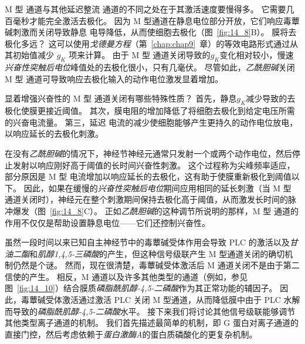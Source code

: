 M 型  通道与其他延迟整流  通道的不同之处在于其激活速度要慢得多。
它需要几百毫秒才能完全激活去极化。
因为 M 型通道在静息电位部分开放，它们响应毒蕈碱刺激而关闭导致静息  电导降低，从而使细胞去极化（图~\ref{fig:14_8}B）。
膜将去极化多远？
这可以使用\textit{戈德曼方程}（第~\ref{chap:chap9}~章）的等效电路形式通过从其初始值减少 $g_K$ 项来计算。
由于 M 型  通道关闭导致的$g_K$变化相对较小，慢速\textit{兴奋性突触后电位}峰值处的去极化很小，只有几毫伏。
尽管如此，\textit{乙酰胆碱}关闭 M 型  通道可导致响应去极化输入的动作电位激发显着增加。


显着增强兴奋性的 M 型  通道关闭有哪些特殊性质？
首先，静息$g_K$减少导致的去极化使膜更接近阈值。
其次，膜电阻的增加降低了将细胞去极化到给定电压所需的兴奋电流量。
第三，延迟  电流的减少使细胞能够产生更持久的动作电位放电，以响应延长的去极化刺激。


在没有\textit{乙酰胆碱}的情况下，神经节神经元通常只发射一个或两个动作电位，然后停止发射以响应刚好高于阈值的长时间兴奋性刺激。
这个过程称为尖峰频率适应，部分原因是 M 型  电流增加以响应延长的去极化，这有助于使膜重新极化到阈值以下。
因此，如果在缓慢的\textit{兴奋性突触后电位}期间应用相同的延长刺激（当 M 型  通道关闭时），神经元在整个刺激期间保持去极化高于阈值，从而激发长时间的脉冲爆发（图~\ref{fig:14_8}C）。
正如\textit{乙酰胆碱}的这种调节所说明的那样，M 型  通道的作用不仅仅是帮助设置静息电位——它们还控制兴奋性。


虽然一段时间以来已知自主神经节中的毒蕈碱受体作用会导致 PLC 的激活以及\textit{甘油二酯}和\textit{肌醇1,4,5-三磷酸}的产生，但这种信号级联产生 M 型通道关闭的确切机制仍然是个谜。
然而，现在很清楚，毒蕈碱受体激活后 M 通道关闭不是由于第二信使的产生。
相反，M 通道以及许多其他类型的通道（例如，参见图~\ref{fig:14_10}）结合膜质\textit{磷脂酰肌醇-4,5-二磷酸}作为其正常功能的辅因子。
因此，毒蕈碱受体激活通过激活 PLC 关闭 M 型通道，从而降低膜中由于 PLC 水解而导致的\textit{磷脂酰肌醇-4,5-二磷酸}水平。
接下来我们将讨论其他信号级联能够调节其他类型离子通道的机制。
我们首先描述最简单的机制，即 G 蛋白对离子通道的直接门控，然后考虑依赖于\textit{蛋白激酶A}的蛋白质磷酸化的更复杂机制。



